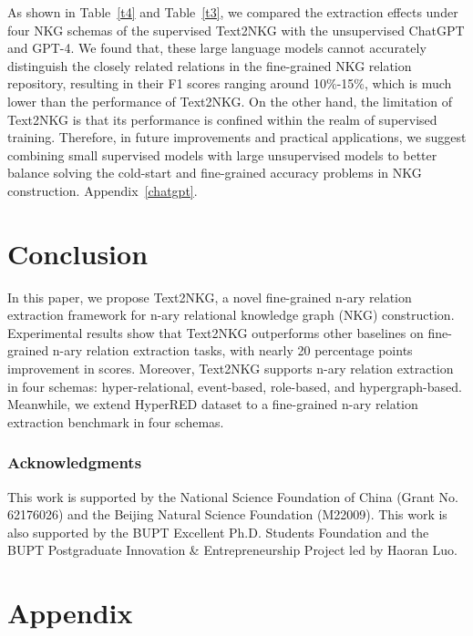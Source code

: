\documentclass{article} \usepackage{iclr2024_conference,times}
\begin{document}
As shown in Table~\ref{t4} and Table~\ref{t3}, we compared the extraction effects under four NKG schemas of the supervised Text2NKG with the unsupervised ChatGPT and GPT-4. We found that, these large language models cannot accurately distinguish the closely related relations in the fine-grained NKG relation repository, resulting in their F1 scores ranging around 10\%-15\%, which is much lower than the performance of Text2NKG. 
On the other hand, the limitation of Text2NKG is that its performance is confined within the realm of supervised training. Therefore, in future improvements and practical applications, we suggest combining small supervised models with large unsupervised models to better balance solving the cold-start and fine-grained accuracy problems in NKG construction. Appendix~\ref{chatgpt}.


\section{Conclusion}
In this paper, we propose Text2NKG, a novel fine-grained n-ary relation extraction framework for n-ary relational knowledge graph (NKG) construction. Experimental results show that Text2NKG outperforms other baselines on fine-grained n-ary relation extraction tasks, with nearly 20 percentage points improvement in  scores. Moreover, Text2NKG supports n-ary relation extraction in four schemas: hyper-relational, event-based, role-based, and hypergraph-based. Meanwhile, we extend HyperRED dataset to a fine-grained n-ary relation extraction benchmark in four schemas.

\subsubsection*{Acknowledgments}
This work is supported by the National Science Foundation of China (Grant No. 62176026) and the Beijing Natural Science Foundation (M22009). This work is also supported by the BUPT Excellent Ph.D. Students Foundation and the BUPT Postgraduate Innovation \& Entrepreneurship Project led by Haoran Luo.














\newpage
\appendix
\section*{Appendix} 
\end{document}
